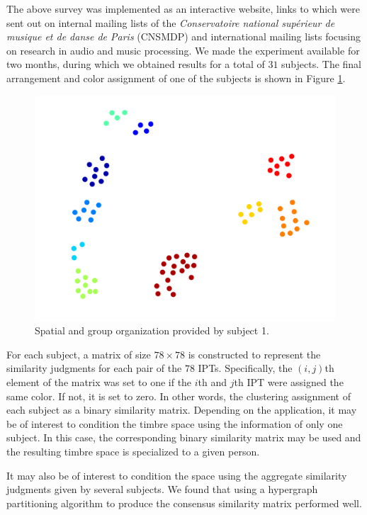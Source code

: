 \documentclass{bmcart}
\begin{document}
The above survey was implemented as an interactive website, links to which were sent out on internal mailing lists of the \emph{Conservatoire national sup\'erieur de musique et de danse de Paris} (CNSMDP) and international mailing lists focusing on research in audio and music processing.
We made the experiment available for two months, during which we obtained results for a total of $31$ subjects.
The final arrangement and color assignment of one of the subjects is shown in Figure \ref{fig:xp2display}.

\begin{figure}
\center
\includegraphics[width = \textwidth]{figures/xp2example1.png}
\caption{Spatial and group organization provided by subject 1.}
\label{fig:xp2display}
\end{figure}

For each subject, a matrix of size $78 \times 78$ is constructed to represent the similarity judgments for each pair of the $78$ IPTs.
Specifically, the $(i, j)$th element of the matrix was set to one if the $i$th and $j$th IPT were assigned the same color.
If not, it is set to zero.
In other words, the clustering assignment of each subject as a binary similarity matrix. Depending on the application, it may be of interest to condition the timbre space using the information of only one subject. In this case, the corresponding binary similarity matrix may be used and the resulting timbre space is specialized to a given person.


It may also be of interest to condition the space using the aggregate similarity judgments given by several subjects. We found that using a hypergraph partitioning algorithm \cite{kernighan1970efficient,han1997scalable,strehl2002cluster} to produce the consensus similarity matrix performed well.
\end{document}

